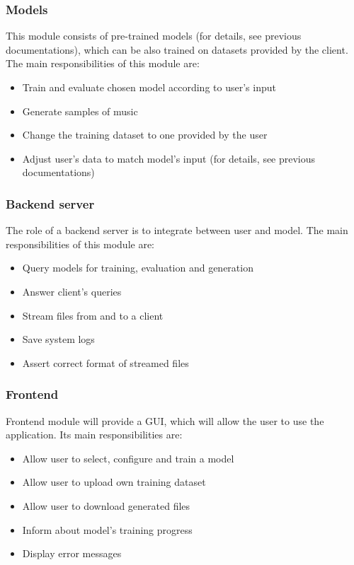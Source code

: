 \documentclass{article}
\begin{document}
\subsubsection{Models}
This module consists of pre-trained models (for details, see previous documentations), which can be also trained on datasets provided by the client. The main responsibilities of this module are:
\begin{itemize}
    \item Train and evaluate chosen model according to user's input
    \item Generate samples of music
    \item Change the training dataset to one provided by the user
    \item Adjust user's data to match model's input (for details, see previous documentations)
\end{itemize}

\subsubsection{Backend server}
The role of a backend server is to integrate between user and model. The main responsibilities of this module are:
\begin{itemize}
    \item Query models for training, evaluation and generation
    \item Answer client's queries
    \item Stream files from and to a client
    \item Save system logs
    \item Assert correct format of streamed files
\end{itemize}

\subsubsection{Frontend}
Frontend module will provide a GUI, which will allow the user to use the application. Its main responsibilities are:
\begin{itemize}
    \item Allow user to select, configure and train a model
    \item Allow user to upload own training dataset
    \item Allow user to download generated files
    \item Inform about model's training progress
    \item Display error messages
\end{itemize}
\end{document}
